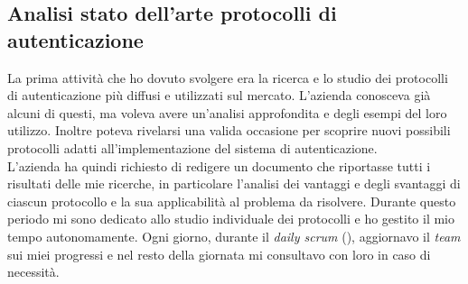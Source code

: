 \subsection{Analisi stato dell'arte protocolli di autenticazione}\label{sec:att_analisi}
    La prima attività che ho dovuto svolgere era la ricerca e lo studio dei protocolli di autenticazione più diffusi e utilizzati sul mercato. L'azienda conosceva già alcuni di questi, ma voleva avere un'analisi approfondita e degli esempi del loro utilizzo. Inoltre poteva rivelarsi una valida occasione per scoprire nuovi possibili protocolli adatti all'implementazione del sistema di autenticazione. \\
    L'azienda ha quindi richiesto di redigere un documento che riportasse tutti i risultati delle mie ricerche, in particolare l'analisi dei vantaggi e degli svantaggi di ciascun protocollo e la sua applicabilità al problema da risolvere.
    Durante questo periodo mi sono dedicato allo studio individuale dei protocolli e ho gestito il mio tempo autonomamente. Ogni giorno, durante il \textit{daily scrum} (), aggiornavo il \textit{team} sui miei progressi e nel resto della giornata mi consultavo con loro in caso di necessità.

